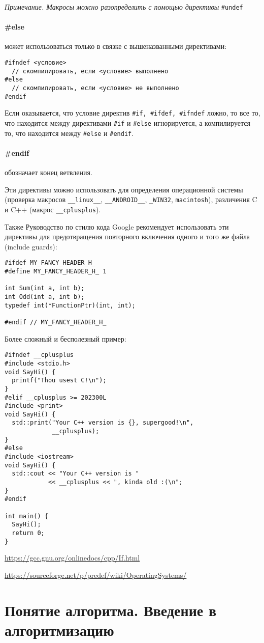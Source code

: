 \documentclass[14pt, a4paper]{extarticle}
\begin{document}
{\small \textit{Примечание. Макросы можно разопределить с помощью директивы} \verb|#undef| }

\paragraph{\#else} может использоваться только в связке с вышеназванными директивами:
\begin{verbatim}
#ifndef <условие>
  // скомпилировать, если <условие> выполнено
#else
  // скомпилировать, если <условие> не выполнено
#endif
\end{verbatim}

Если оказывается, что условие директив \verb|#if, #ifdef, #ifndef| ложно, то все то, что находится между директивами \verb|#if|
и \verb|#else| игнорируется, а компилируется то, что находится между \verb|#else| и \verb|#endif|.

\paragraph{\#endif} обозначает конец ветвления.

Эти директивы можно использовать для определения операционной системы (проверка макросов \verb|__linux__|, \verb|__ANDROID__|,
\verb|_WIN32|, \verb|macintosh|),
различения C и C++ (макрос \verb|__cplusplus|).

Также Руководство по стилю кода Google рекомендует использовать эти директивы для предотвращения повторного включения одного
и того же файла (include guards):
\begin{verbatim}
#ifdef MY_FANCY_HEADER_H_
#define MY_FANCY_HEADER_H_ 1

int Sum(int a, int b);
int Odd(int a, int b);
typedef int(*FunctionPtr)(int, int);

#endif // MY_FANCY_HEADER_H_
\end{verbatim}

Более сложный и бесполезный пример:
\begin{verbatim}
#ifndef __cplusplus
#include <stdio.h>
void SayHi() {
  printf("Thou usest C!\n");
}
#elif __cplusplus >= 202300L
#include <print>
void SayHi() {
  std::print("Your C++ version is {}, supergood!\n",
             __cplusplus);
}
#else
#include <iostream>
void SayHi() {
  std::cout << "Your C++ version is "
            << __cplusplus << ", kinda old :(\n";
}
#endif

int main() {
  SayHi();
  return 0;
}
\end{verbatim}

\url{https://gcc.gnu.org/onlinedocs/cpp/If.html}

\url{https://sourceforge.net/p/predef/wiki/OperatingSystems/}

\section{Понятие алгоритма. Введение в алгоритмизацию}
\end{document}
